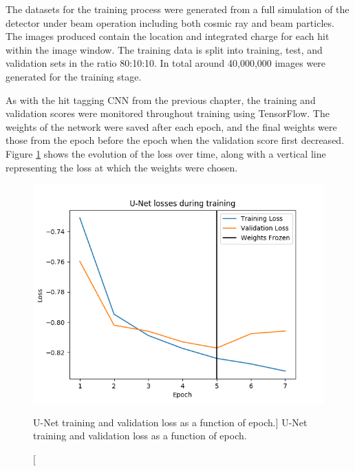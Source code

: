 The datasets for the training process were generated from a full simulation of 
the \protodune{} detector under beam operation including both cosmic ray and
beam particles. The images produced contain the location and integrated charge
for each hit within the image window. The training data is split into training, 
test, and validation sets in the ratio 80:10:10. In total around 40,000,000 
images were generated for the training stage.

As with the hit tagging CNN from the previous chapter, the training and
validation scores were monitored throughout training using TensorFlow. The
weights of the network were saved after each epoch, and the final weights were
those from the epoch before the epoch when the validation score first decreased.
Figure \ref{fig:unet_loss} shows the evolution of the loss over time, along with
a vertical line representing the loss at which the weights were chosen.
\begin{figure}
	\centering
	\includegraphics[width=\textwidth]{figures/unet_loss.png}
	\caption
	[U-Net training and validation loss as a function of epoch.]
	{U-Net training and validation loss as a function of epoch.}
	\label{fig:unet_loss}
\end{figure}


